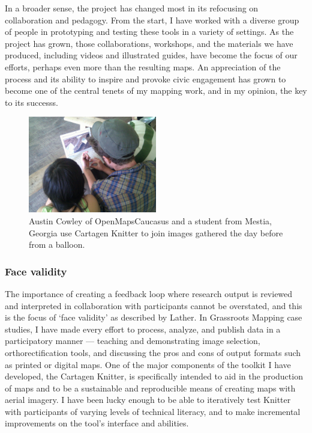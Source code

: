 \documentclass[11pt,oneside,notitlepage]{report}
\begin{document}
In a broader sense, the project has changed most in its refocusing on collaboration and pedagogy. From the start, I have worked with a diverse group of people in prototyping and testing these tools in a variety of settings. As the project has grown, those collaborations, workshops, and the materials we have produced, including videos and illustrated guides, have become the focus of our efforts, perhaps even more than the resulting maps. An appreciation of the process and its ability to inspire and provoke civic engagement has grown to become one of the central tenets of my mapping work, and in my opinion, the key to its successs. 

\begin{figure}
  \begin{flushleft}
	\includegraphics[width=0.5\textwidth]{images/knitter-mestia.jpg} 
	\caption{Austin Cowley of OpenMapsCaucasus and a student from Mestia, Georgia use Cartagen Knitter to join images gathered the day before from a balloon.}
  \end{flushleft}
\end{figure}

\subsubsection{Face validity}

The importance of creating a feedback loop where research output is reviewed and interpreted in collaboration with participants cannot be overstated, and this is the focus of `face validity' as described by Lather. In Grassroots Mapping case studies, I have made every effort to process, analyze, and publish data in a participatory manner --- teaching and demonstrating image selection, orthorectification tools, and discussing the pros and cons of output formats such as printed or digital maps. One of the major components of the toolkit I have developed, the Cartagen Knitter, is specifically intended to aid in the production of maps and to be a sustainable and reproducible means of creating maps with aerial imagery. I have been lucky enough to be able to iteratively test Knitter with participants of varying levels of technical literacy, and to make incremental improvements on the tool's interface and abilities.  
\end{document}

